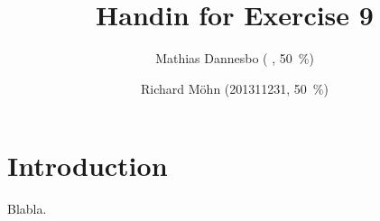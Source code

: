 \documentclass{scrartcl}
\newcommand*{\uPerc}[1]{\SI{#1}{\percent}}
\begin{document}
\subject{dDist 2014}
\title{Handin for Exercise 9}
\author{Mathias Dannesbo ( , \uPerc{50}) \and Richard Möhn (201311231,
\uPerc{50})}

\maketitle

\section{Introduction}

Blabla.
    
\end{document}
